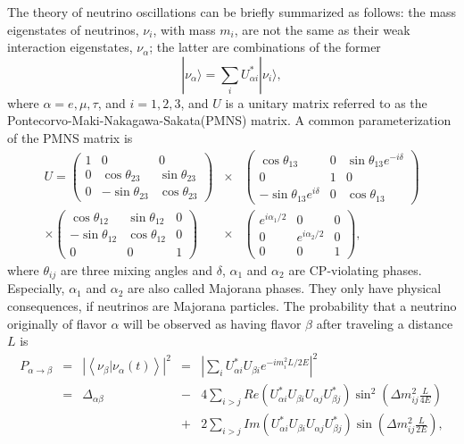 The theory of neutrino oscillations can be briefly summarized as
follows: the mass eigenstates of neutrinos, $\nu_{i}$, with mass
$m_{i}$, are not the same as their weak interaction eigenstates,
$\nu_{\alpha}$; the latter are combinations of the former
\begin{equation}
  \label{eq:osci}
  |\nu_{\alpha}\rangle=\sum_{i}U^{*}_{\alpha i}|\nu_{i}\rangle,
\end{equation}
where $\alpha=e,\mu,\tau$, and $i=1,2,3$, and $U$ is a unitary matrix
referred to as the Pontecorvo-Maki-Nakagawa-Sakata(PMNS) matrix. A
common parameterization of the PMNS matrix is
\begin{equation}
  \label{eq:pmns}
  \begin{array}{rcl}
  U = \left(\begin{array}{ccc}
  1 & 0 & 0 \\ 0 & \cos\theta_{23} & \sin\theta_{23} \\ 
  0 & -\sin\theta_{23} & \cos\theta_{23}
  \end{array}\right) &\times&
  \left(\begin{array}{ccc}
  \cos\theta_{13} & 0 & \sin\theta_{13}e^{-i\delta} \\ 
  0 & 1 & 0 \\ -\sin\theta_{13}e^{i\delta} & 0 & \cos\theta_{13}
  \end{array}\right) \\ \times
  \left(\begin{array}{ccc}
  \cos\theta_{12} & \sin\theta_{12} & 0 \\ 
  -\sin\theta_{12} & \cos\theta_{12} & 0 \\ 0 & 0 & 1
  \end{array}\right) &\times&
  \left(\begin{array}{ccc}
  e^{i\alpha_1/2} & 0 & 0 \\ 0 & e^{i\alpha_2/2} & 0 \\ 0 & 0 & 1
  \end{array}\right),
  \end{array}
\end{equation}
where $\theta_{ij}$ are three mixing angles and $\delta$, $\alpha_1$
and $\alpha_2$ are CP-violating phases. Especially, $\alpha_1$ and
$\alpha_2$ are also called Majorana phases. They only have physical
consequences, if neutrinos are Majorana particles. The probability
that a neutrino originally of flavor $\alpha$ will be observed as
having flavor $\beta$ after traveling a distance $L$ is
\begin{equation}
  \label{eq:pa2b}
  \begin{array}{ccccl}
  P_{\alpha \rightarrow \beta} &=& \left| \left\langle 
  \nu_{\beta}|\nu_{\alpha}(t) \right\rangle \right|^{2} &=& 
  {\displaystyle \left| 
  \sum_{i}U_{\alpha i}^{*}U_{\beta i}e^{-i m_{i}^2 L/2E} \right|^{2}}\\ 
  &=& \Delta_{\alpha\beta} &-& 4{\displaystyle \sum_{i>j}
  Re(U_{\alpha i}^{*}U_{\beta i}U_{\alpha j}U_{\beta j}^{*})
  \sin^{2}(\Delta m_{ij}^{2} \frac{L}{4E})}\\ & & &+& 
  {\displaystyle 2\sum_{i>j}Im(U_{\alpha i}^{*}
  U_{\beta i}U_{\alpha j}U_{\beta j}^{*})\sin(\Delta m_{ij}^{2}\frac{L}{2E})},
  \end{array}
\end{equation}
